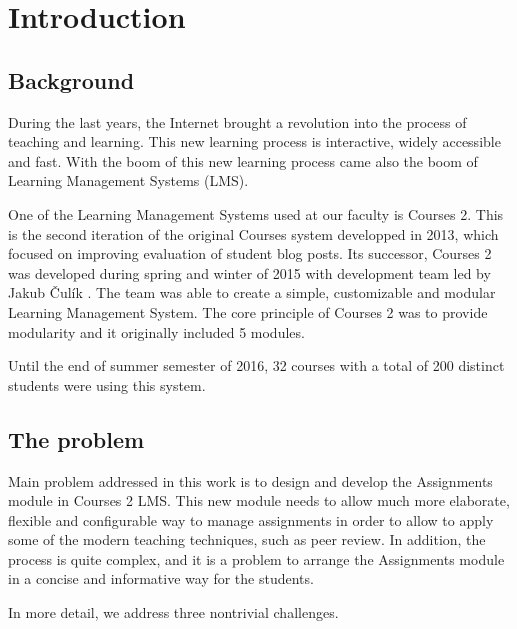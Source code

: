\chapter*{Introduction}

\section*{Background}
During the last years, the Internet brought a revolution into the process of teaching and learning. This new learning process is interactive, widely accessible and fast. With the boom of this new learning process came also the boom of Learning Management Systems (LMS).


One of the Learning Management Systems used at our faculty is Courses 2. This is the second iteration of the original Courses system developped in 2013, which focused on improving evaluation of student blog posts.  Its successor, Courses 2  was developed during spring and winter of 2015 with development team led by Jakub \v{C}ul\'{i}k \cite{culik}. The team was able to create a simple, customizable and modular Learning Management System. The core principle of Courses 2 was to provide modularity and it originally included 5 modules. 

Until the end of summer semester of 2016, 32 courses with a total of 200 distinct students were using this system.

\section*{The problem}

Main problem addressed in this work is to design and develop the Assignments module in Courses 2 LMS. This new module needs to allow much more elaborate, flexible and configurable way to manage assignments in order to allow to apply some of the modern teaching techniques, such as peer review. In addition, the process is quite complex, and it is a problem to arrange the Assignments module in a concise and informative way for the students. 

In more detail, we address three nontrivial challenges.

